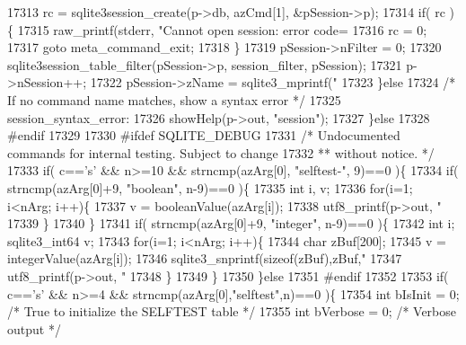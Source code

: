 \begin{DoxyCode}
{{{{{{{{{{{{{{{{{{{{{{{{{{{{{{{{{{{{{{{{{{{{{{{{{{{{{{{{{{{{{{{{{{{{{{{{{{{{{{{{{{{{{{{{{{{{{{17313       rc = sqlite3session\_create(p->db, azCmd[1], &pSession->p);
17314       \textcolor{keywordflow}{if}( rc )\{
17315         raw_printf(stderr, \textcolor{stringliteral}{"Cannot open session: error code=%
17316         rc = 0;
17317         \textcolor{keywordflow}{goto} meta\_command\_exit;
17318       \}
17319       pSession->nFilter = 0;
17320       sqlite3session\_table\_filter(pSession->p, session\_filter, pSession);
17321       p->nSession++;
17322       pSession->zName = sqlite3_mprintf(\textcolor{stringliteral}{"%
17323     \}\textcolor{keywordflow}{else}
17324     \textcolor{comment}{/* If no command name matches, show a syntax error */}
17325     session\_syntax\_error:
17326     showHelp(p->out, \textcolor{stringliteral}{"session"});
17327   \}\textcolor{keywordflow}{else}
17328 \textcolor{preprocessor}{#endif}
17329 
17330 \textcolor{preprocessor}{#ifdef SQLITE\_DEBUG}
17331   \textcolor{comment}{/* Undocumented commands for internal testing.  Subject to change}
17332 \textcolor{comment}{  ** without notice. */}
17333   \textcolor{keywordflow}{if}( c==\textcolor{charliteral}{'s'} && n>=10 && strncmp(azArg[0], \textcolor{stringliteral}{"selftest-"}, 9)==0 )\{
17334     \textcolor{keywordflow}{if}( strncmp(azArg[0]+9, \textcolor{stringliteral}{"boolean"}, n-9)==0 )\{
17335       \textcolor{keywordtype}{int} i, v;
17336       \textcolor{keywordflow}{for}(i=1; i<nArg; i++)\{
17337         v = booleanValue(azArg[i]);
17338         utf8_printf(p->out, \textcolor{stringliteral}{"%
17339       \}
17340     \}
17341     \textcolor{keywordflow}{if}( strncmp(azArg[0]+9, \textcolor{stringliteral}{"integer"}, n-9)==0 )\{
17342       \textcolor{keywordtype}{int} i; sqlite3_int64 v;
17343       \textcolor{keywordflow}{for}(i=1; i<nArg; i++)\{
17344         \textcolor{keywordtype}{char} zBuf[200];
17345         v = integerValue(azArg[i]);
17346         sqlite3_snprintf(\textcolor{keyword}{sizeof}(zBuf),zBuf,\textcolor{stringliteral}{"%
17347         utf8_printf(p->out, \textcolor{stringliteral}{"%
17348       \}
17349     \}
17350   \}\textcolor{keywordflow}{else}
17351 \textcolor{preprocessor}{#endif}
17352 
17353   \textcolor{keywordflow}{if}( c==\textcolor{charliteral}{'s'} && n>=4 && strncmp(azArg[0],\textcolor{stringliteral}{"selftest"},n)==0 )\{
17354     \textcolor{keywordtype}{int} bIsInit = 0;         \textcolor{comment}{/* True to initialize the SELFTEST table */}
17355     \textcolor{keywordtype}{int} bVerbose = 0;        \textcolor{comment}{/* Verbose output */}
}}}}}}}}}}}}}}}}}}}}}}}}}}}}}}}}}}}}}}}}}}}}}}}}}}}}}}}}}}}}}}}}}}}}}}}}}}}}}}}}}}}}}}}}}}}}}}}}}}}
\end{DoxyCode}
